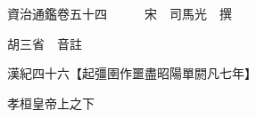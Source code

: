 










 


 
 


 

  
  
  
  
  





  
  
  
  
  
 
  

  

  
  
  



  

 
 

  
   




  

  
  


  　　資治通鑑卷五十四　　　宋　司馬光　撰

　　胡三省　音註

　　漢紀四十六【起彊圉作噩盡昭陽單閼凡七年】

　　孝桓皇帝上之下

